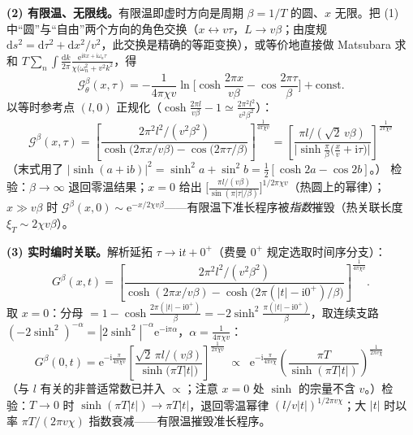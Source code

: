 \textbf{(2) 有限温、无限线。}有限温即虚时方向是周期 $\beta=1/T$ 的圆、$x$ 无限。把 (1) 中“圆”与“自由”两个方向的角色交换（$x\leftrightarrow v\tau$，$L\to v\beta$；由度规 $\mathrm{d}s^{2}=\mathrm{d}\tau^{2}+\mathrm{d}x^{2}/v^{2}$，此交换是精确的等距变换），或等价地直接做 Matsubara 求和 $T\sum_n\int\frac{\mathrm{d}k}{2\pi}\frac{\mathrm{e}^{\mathrm{i}kx+\mathrm{i}\omega_n\tau}}{\chi(\omega_n^{2}+v^{2}k^{2}}$，得
\begin{equation*}
\mathcal{G}^{\beta}_\theta(x,\tau)
=-\frac{1}{4\pi\chi v}\ln\!\Big[\cosh\frac{2\pi x}{v\beta}-\cos\frac{2\pi\tau}{\beta}\Big]+\text{const.}
\end{equation*}
以等时参考点 $(l,0)$ 正规化（$\cosh\frac{2\pi l}{v\beta}-1\simeq\frac{2\pi^{2}l^{2}}{v^{2}\beta^{2}}$）：
\begin{equation*}
\boxed{\;\mathcal{G}^{\beta}(x,\tau)=
\left[\frac{2\pi^{2}l^{2}/(v^{2}\beta^{2})}
{\cosh\!\big(2\pi x/v\beta\big)-\cos\!\big(2\pi\tau/\beta\big)}\right]^{\frac{1}{4\pi\chi v}}
=\left[\frac{\pi l/(\sqrt2\,v\beta)}
{\big|\sinh\frac{\pi}{\beta}\big(\frac{x}{v}+\mathrm{i}\tau\big)\big|}\right]^{\frac{1}{2\pi\chi v}}\;}
\end{equation*}
（末式用了 $|\sinh(a+\mathrm{i}b)|^{2}=\sinh^{2}a+\sin^{2}b=\frac12[\cosh2a-\cos2b]$。）
检验：$\beta\to\infty$ 退回零温结果；$x=0$ 给出 $\big[\frac{\pi l/(v\beta)}{\sin(\pi|\tau|/\beta)}\big]^{1/2\pi\chi v}$（热圆上的幂律）；$x\gg v\beta$ 时 $\mathcal{G}^{\beta}(x,0)\sim\mathrm{e}^{-x/2\chi v\beta}$——有限温下准长程序被\emph{指数}摧毁（热关联长度 $\xi_T\sim2\chi v\beta$）。

\textbf{(3) 实时编时关联。}解析延拓 $\tau\to\mathrm{i}t+0^{+}$（费曼 $0^{+}$ 规定选取时间序分支）：
\begin{equation*}
G^{\beta}(x,t)=\left[\frac{2\pi^{2}l^{2}/(v^{2}\beta^{2})}
{\cosh(2\pi x/v\beta)-\cosh\!\big(2\pi(|t|-\mathrm{i}0^{+})/\beta\big)}\right]^{\frac{1}{4\pi\chi v}} .
\end{equation*}
取 $x=0$：分母 $=1-\cosh\frac{2\pi(|t|-\mathrm{i}0^{+})}{\beta}=-2\sinh^{2}\frac{\pi(|t|-\mathrm{i}0^{+})}{\beta}$，取连续支路 $(-2\sinh^{2})^{-\alpha}=|2\sinh^{2}|^{-\alpha}\mathrm{e}^{-\mathrm{i}\pi\alpha}$，$\alpha=\frac{1}{4\pi\chi v}$：
\begin{equation*}
G^{\beta}(0,t)
=\mathrm{e}^{-\mathrm{i}\frac{\pi}{4\pi\chi v}}
\left[\frac{\sqrt2\,\pi l/(v\beta)}{\sinh\!\big(\pi T|t|\big)}\right]^{\frac{1}{2\pi\chi v}}
\;\propto\;
\boxed{\;\mathrm{e}^{-\mathrm{i}\frac{\pi}{4\pi v\chi}}
\left(\frac{\pi T}{\sinh(\pi T|t|)}\right)^{\frac{1}{2\pi v\chi}}\;}
\end{equation*}
（与 $l$ 有关的非普适常数已并入 $\propto$；注意 $x=0$ 处 $\sinh$ 的宗量不含 $v$。）检验：$T\to0$ 时 $\sinh(\pi T|t|)\to\pi T|t|$，退回零温幂律 $(l/v|t|)^{1/2\pi v\chi}$；大 $|t|$ 时以率 $\pi T/(2\pi v\chi)$ 指数衰减——有限温摧毁准长程序。

